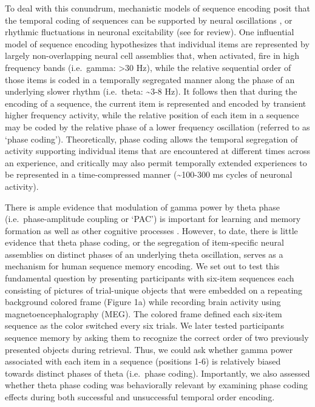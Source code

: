 To deal with this conundrum, mechanistic models of sequence encoding
posit that the temporal coding of sequences can be supported by neural
oscillations
\autocites{lisman_storage_1995}{jensen_hippocampal_1996}{lisman_-_2013}{jensen_physiologically_1996}{koene_first-first-out_2007},
or rhythmic fluctuations in neuronal excitability (see
\textcite{buzsaki_neuronal_2004} for review). One influential model of
sequence encoding \autocites{lisman_storage_1995}{lisman_-_2013}
hypothesizes that individual items are represented by largely
non-overlapping neural cell assemblies that, when activated, fire in
high frequency bands (i.e.~gamma: \textgreater{}30 Hz), while the
relative sequential order of those items is coded in a temporally
segregated manner along the phase of an underlying slower rhythm
(i.e.~theta: \textasciitilde{}3-8 Hz). It follows then that during the
encoding of a sequence, the current item is represented and encoded by
transient higher frequency activity, while the relative position of each
item in a sequence may be coded by the relative phase of a lower
frequency oscillation (referred to as `phase coding'). Theoretically,
phase coding allows the temporal segregation of activity supporting
individual items that are encountered at different times across an
experience, and critically may also permit temporally extended
experiences to be represented in a time-compressed manner
\autocite{jensen_physiologically_1996} (\textasciitilde{}100-300 ms
cycles of neuronal activity).

There is ample evidence that modulation of gamma power by theta phase
(i.e.~phase-amplitude coupling or `PAC') is important for learning and
memory formation
\autocites{axmacher_cross-frequency_2010}{tort_thetagamma_2009}{friese_successful_2013}{fuentemilla_theta-coupled_2010}[gamma\_2014]{lega_slow-theta}
as well as other cognitive processes
\autocites{canolty_high_2006}{giraud_cortical_2012}{szczepanski_dynamic_2014}.
However, to date, there is little evidence that theta phase coding, or
the segregation of item-specific neural assemblies on distinct phases of
an underlying theta oscillation, serves as a mechanism for human
sequence memory encoding. We set out to test this fundamental question
by presenting participants with six-item sequences each consisting of
pictures of trial-unique objects that were embedded on a repeating
background colored frame (Figure 1a) while recording brain activity
using magnetoencephalography (MEG). The colored frame defined each
six-item sequence as the color switched every six trials. We later
tested participants sequence memory by asking them to recognize the
correct order of two previously presented objects during retrieval.
Thus, we could ask whether gamma power associated with each item in a
sequence (positions 1-6) is relatively biased towards distinct phases of
theta (i.e.~phase coding). Importantly, we also assessed whether theta
phase coding was behaviorally relevant by examining phase coding effects
during both successful and unsuccessful temporal order encoding.

